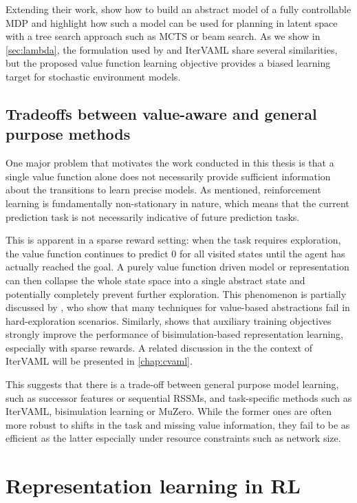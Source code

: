 Extending their work, \textcite{oh2017value} show how to build an abstract model of a fully controllable MDP and highlight how such a model can be used for planning in latent space with a tree search approach such as MCTS \parencite{schrittwieser2020mastering} or beam search.
As we show in \autoref{sec:lambda}, the formulation used by \textcite{silver2017predictron} and IterVAML share several similarities, but the proposed value function learning objective provides a biased learning target for stochastic environment models.

\subsection{Tradeoffs between value-aware and general purpose methods}

One major problem that motivates the work conducted in this thesis is that a single value function alone does not necessarily provide sufficient information about the transitions to learn precise models.
As mentioned, reinforcement learning is fundamentally non-stationary in nature, which means that the current prediction task is not necessarily indicative of future prediction tasks.

This is apparent in a sparse reward setting: when the task requires exploration, the value function continues to predict $0$ for all visited states until the agent has actually reached the goal.
A purely value function driven model or representation can then collapse the whole state space into a single abstract state and potentially completely prevent further exploration.
This phenomenon is partially discussed by \textcite{tomar2021learning}, who show that many techniques for value-based abstractions fail in hard-exploration scenarios.
Similarly, \textcite{kemertas2021towards} shows that auxiliary training objectives strongly improve the performance of bisimulation-based representation learning, especially with sparse rewards.
A related discussion in the the context of IterVAML will be presented in \autoref{chap:cvaml}.

This suggests that there is a trade-off between general purpose model learning, such as successor features or sequential RSSMs, and task-specific methods such as IterVAML, bisimulation learning or MuZero.
While the former ones are often more robust to shifts in the task and missing value information, they fail to be as efficient as the latter especially under resource constraints such as network size.


\section{Representation learning in RL}

